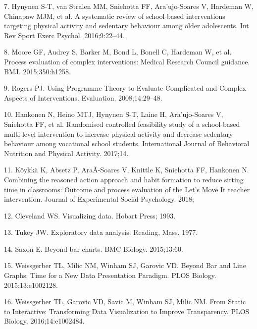 \documentclass[english,man,floatsintext]{apa6}
\begin{document}
\leavevmode\hypertarget{ref-hynynenSystematicReviewSchoolbased2016}{}%
7. Hynynen S-T, van Stralen MM, Sniehotta FF, Ara\a'ujo-Soares V, Hardeman W, Chinapaw MJM, et al. A systematic review of school-based interventions targeting physical activity and sedentary behaviour among older adolescents. Int Rev Sport Exerc Psychol. 2016;9:22--44.

\leavevmode\hypertarget{ref-mooreProcessEvaluationComplex2015}{}%
8. Moore GF, Audrey S, Barker M, Bond L, Bonell C, Hardeman W, et al. Process evaluation of complex interventions: Medical Research Council guidance. BMJ. 2015;350:h1258.

\leavevmode\hypertarget{ref-rogersUsingProgrammeTheory2008a}{}%
9. Rogers PJ. Using Programme Theory to Evaluate Complicated and Complex Aspects of Interventions. Evaluation. 2008;14:29--48.

\leavevmode\hypertarget{ref-hankonenRandomisedControlledFeasibility2017}{}%
10. Hankonen N, Heino MTJ, Hynynen S-T, Laine H, Ara\a'ujo-Soares V, Sniehotta FF, et al. Randomised controlled feasibility study of a school-based multi-level intervention to increase physical activity and decrease sedentary behaviour among vocational school students. International Journal of Behavioral Nutrition and Physical Activity. 2017;14.

\leavevmode\hypertarget{ref-koykkaCombiningReasonedAction2018}{}%
11. Köykkä K, Absetz P, AraÃ\textordmasculinejo-Soares V, Knittle K, Sniehotta FF, Hankonen N. Combining the reasoned action approach and habit formation to reduce sitting time in classrooms: Outcome and process evaluation of the Let's Move It teacher intervention. Journal of Experimental Social Psychology. 2018;

\leavevmode\hypertarget{ref-clevelandVisualizingData1993}{}%
12. Cleveland WS. Visualizing data. Hobart Press; 1993.

\leavevmode\hypertarget{ref-tukeyExploratoryDataAnalysis1977}{}%
13. Tukey JW. Exploratory data analysis. Reading, Mass. 1977.

\leavevmode\hypertarget{ref-saxonBarCharts2015}{}%
14. Saxon E. Beyond bar charts. BMC Biology. 2015;13:60.

\leavevmode\hypertarget{ref-weissgerberBarLineGraphs2015}{}%
15. Weissgerber TL, Milic NM, Winham SJ, Garovic VD. Beyond Bar and Line Graphs: Time for a New Data Presentation Paradigm. PLOS Biology. 2015;13:e1002128.

\leavevmode\hypertarget{ref-weissgerberStaticInteractiveTransforming2016}{}%
16. Weissgerber TL, Garovic VD, Savic M, Winham SJ, Milic NM. From Static to Interactive: Transforming Data Visualization to Improve Transparency. PLOS Biology. 2016;14:e1002484.
\end{document}
